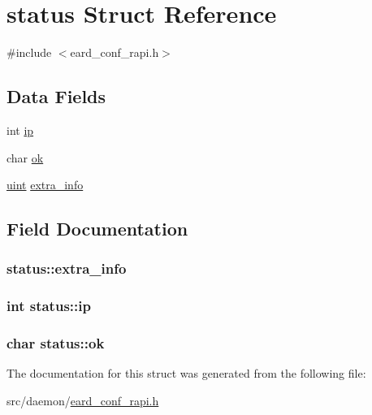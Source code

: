 \hypertarget{structstatus}{}\section{status Struct Reference}
\label{structstatus}


{\ttfamily \#include $<$eard\+\_\+conf\+\_\+rapi.\+h$>$}

\subsection*{Data Fields}
\begin{DoxyCompactItemize}
\item 
int \hyperlink{structstatus_a9a85a135d4221fdbc270ca331c44aef7}{ip}
\item 
char \hyperlink{structstatus_ac908274a2d2b3de6272446021004e721}{ok}
\item 
\hyperlink{generic_8h_a91ad9478d81a7aaf2593e8d9c3d06a14}{uint} \hyperlink{structstatus_a1433238dfb50a6ebbcda2e96a0c18e03}{extra\+\_\+info}
\end{DoxyCompactItemize}


\subsection{Field Documentation}
\subsubsection[{\texorpdfstring{extra\+\_\+info}{extra_info}}]{ status\+::extra\+\_\+info}\hypertarget{structstatus_a1433238dfb50a6ebbcda2e96a0c18e03}{}\label{structstatus_a1433238dfb50a6ebbcda2e96a0c18e03}
\subsubsection[{\texorpdfstring{ip}{ip}}]{\setlength{\rightskip}{0pt plus 5cm}int status\+::ip}\hypertarget{structstatus_a9a85a135d4221fdbc270ca331c44aef7}{}\label{structstatus_a9a85a135d4221fdbc270ca331c44aef7}
\subsubsection[{\texorpdfstring{ok}{ok}}]{\setlength{\rightskip}{0pt plus 5cm}char status\+::ok}\hypertarget{structstatus_ac908274a2d2b3de6272446021004e721}{}\label{structstatus_ac908274a2d2b3de6272446021004e721}


The documentation for this struct was generated from the following file\+:\begin{DoxyCompactItemize}
\item 
src/daemon/\hyperlink{eard__conf__rapi_8h}{eard\+\_\+conf\+\_\+rapi.\+h}\end{DoxyCompactItemize}
